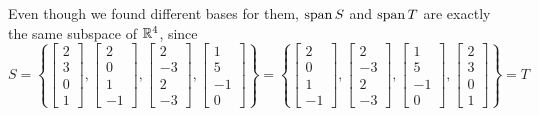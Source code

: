 \begin{observation}
  Even though we found different bases for them,
  \(\operatorname{span} S\) and \(\operatorname{span} T\) are exactly the same subspace of \(\mathbb{R}^4\),
  since
  \[
    S=\left\{
    \begin{bmatrix}2\\3\\0\\1\end{bmatrix},
    \begin{bmatrix}2\\0\\1\\-1\end{bmatrix},
    \begin{bmatrix}2\\-3\\2\\-3\end{bmatrix},
    \begin{bmatrix}1\\5\\-1\\0\end{bmatrix}
    \right\}
      =
    \left\{
    \begin{bmatrix}2\\0\\1\\-1\end{bmatrix},
    \begin{bmatrix}2\\-3\\2\\-3\end{bmatrix},
    \begin{bmatrix}1\\5\\-1\\0\end{bmatrix},
    \begin{bmatrix}2\\3\\0\\1\end{bmatrix}
    \right\}=T
  \]
\end{observation}


